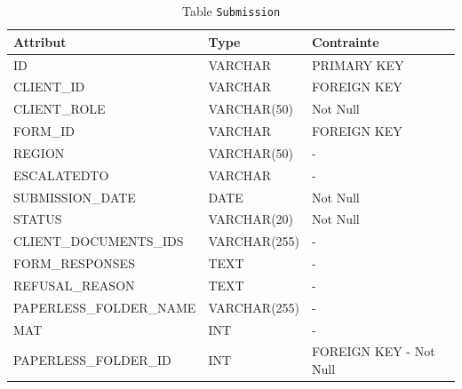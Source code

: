 \begin{table}[h!]
\centering
\begin{tabular}{|l|l|l|}
\hline
\textbf{Attribut} & \textbf{Type} & \textbf{Contrainte} \\
\hline
ID & VARCHAR & PRIMARY KEY \\
CLIENT\_ID & VARCHAR & FOREIGN KEY \\
CLIENT\_ROLE & VARCHAR(50) & Not Null \\
FORM\_ID & VARCHAR & FOREIGN KEY \\
REGION & VARCHAR(50) & - \\
ESCALATEDTO & VARCHAR & - \\
SUBMISSION\_DATE & DATE & Not Null \\
STATUS & VARCHAR(20) & Not Null \\
CLIENT\_DOCUMENTS\_IDS & VARCHAR(255) & - \\
FORM\_RESPONSES & TEXT & - \\
REFUSAL\_REASON & TEXT & - \\
PAPERLESS\_FOLDER\_NAME & VARCHAR(255) & - \\
MAT & INT & - \\
PAPERLESS\_FOLDER\_ID & INT & FOREIGN KEY - Not Null \\
\hline
\end{tabular}
\caption{Table \texttt{Submission}}
\end{table}

